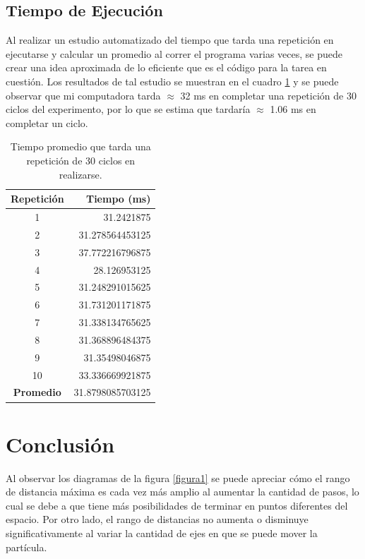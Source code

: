 \documentclass{article}
\begin{document}
\newpage

\subsection{Tiempo de Ejecuci\'on}
Al realizar un estudio automatizado del tiempo que tarda una repetici\'on en ejecutarse y calcular un promedio al correr el programa varias veces, se puede crear una idea aproximada de lo eficiente que es el c\'odigo para la tarea en cuesti\'on. Los resultados de tal estudio se muestran en el cuadro \ref{cuadro1} y se puede observar que mi computadora tarda $\approx$ 32 ms en completar una repetici\'on de 30 ciclos del experimento, por lo que se estima que tardar\'ia $\approx$ 1.06 ms en completar un ciclo.

\begin{table}
    \centering
    \caption{Tiempo promedio que tarda una repetici\'on de 30 ciclos en realizarse.}
    \begin{tabular}{|c|r|}
    \hline
        \textbf{Repetici\'on} & \textbf{Tiempo (ms)} \\
    \hline\hline
        1  & 31.2421875 \\
    \hline
        2 & 31.278564453125 \\
    \hline
        3 & 37.772216796875 \\
    \hline
        4 & 28.126953125 \\
    \hline
        5 & 31.248291015625 \\
    \hline
        6 & 31.731201171875 \\
    \hline
        7 & 31.338134765625 \\
    \hline
        8 & 31.368896484375 \\
    \hline
        9 & 31.35498046875 \\
    \hline
        10 & 33.336669921875 \\
    \hline
        \textbf{Promedio} & 31.8798085703125 \\
    \hline
    \end{tabular}
    \label{cuadro1}
\end{table}

\section{Conclusi\'on}
Al observar los diagramas de la figura \ref{figura1} se puede apreciar c\'omo el rango de distancia m\'axima es cada vez m\'as amplio al aumentar la cantidad de pasos, lo cual se debe a que tiene m\'as posibilidades de terminar en puntos diferentes del espacio. Por otro lado, el rango de distancias no aumenta o disminuye significativamente al variar la cantidad de ejes en que se puede mover la part\'icula.\\
\end{document}
